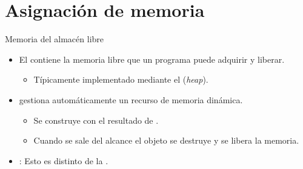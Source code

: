 \section{Asignación de memoria}

\begin{frame}[t]{Memoria del almacén libre}
\begin{itemize}
  \item El  contiene la memoria libre que un programa
        puede adquirir y liberar.
    \begin{itemize}
      \item Típicamente implementado mediante el  (\emph{heap}).
    \end{itemize}

  \item {} gestiona automáticamente un recurso de memoria
        dinámica.
    \begin{itemize}
      \item Se construye con el resultado de .
      \item Cuando se sale del alcance el objeto se destruye y se libera la memoria.
    \end{itemize}

  \item {}: Esto es distinto de la .
\end{itemize}
\end{frame}

